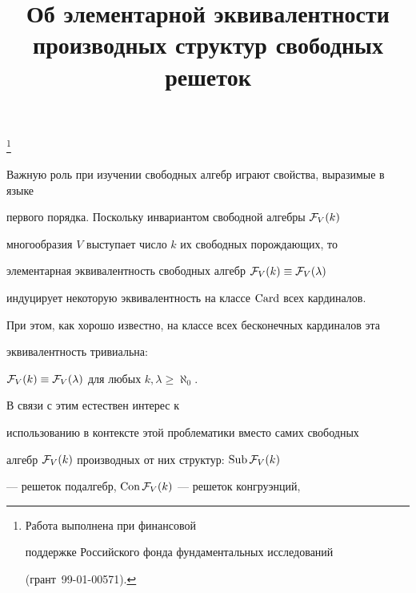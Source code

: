 \title{Об элементарной эквивалентности\\


производных структур свободных решеток}


\thanks{Работа выполнена при финансовой


поддержке Российского фонда фундаментальных исследований 


(грант \No\,99-01-00571).}





\date{}




\pagestyle{plain} %







\maketitle


\label{begin}








Важную роль при изучении свободных алгебр играют свойства, выразимые в языке


первого порядка. Поскольку инвариантом свободной алгебры ${\cal F}_V(k)$


многообразия $V$ выступает число $k$ их свободных порождающих, то 


элементарная эквивалентность свободных алгебр ${\cal F}_V(k)\equiv 


{\cal F}_V(\lambda)$


индуцирует некоторую эквивалентность на классе $\operatorname{Card}$ всех кардиналов.


При этом, как хорошо известно, на классе всех бесконечных кардиналов эта


эквивалентность тривиальна: 


${\cal F}_V(k)\equiv {\cal F}_V(\lambda)$ для любых $k,\lambda\geq\aleph_0$.


В связи с этим естествен интерес к 


использованию в контексте этой проблематики вместо самих свободных


алгебр ${\cal F}_V(k)$ производных от них структур: $\operatorname{Sub}{\cal F}_V(k)$ 


--- решеток подалгебр, $\operatorname{Con}{\cal F}_V(k)$ --- решеток конгруэнций,


